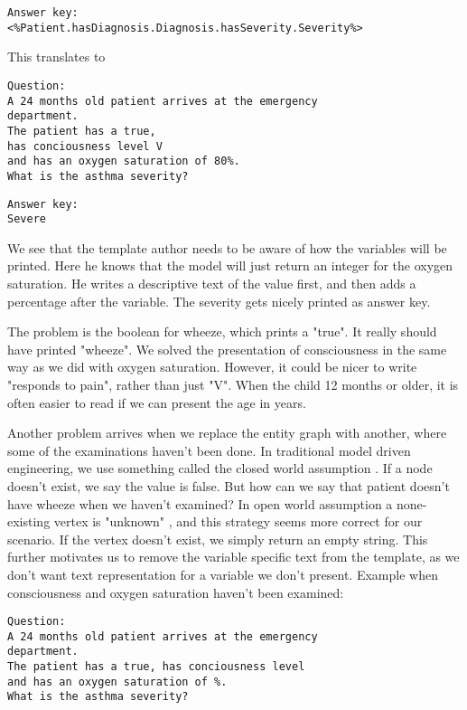  \begin{lstlisting}[caption={Answer key template}, frame=single, captionpos=b] 
Answer key:
<%Patient.hasDiagnosis.Diagnosis.hasSeverity.Severity%>
\end{lstlisting}

This translates to 
\begin{lstlisting}[caption={Question instantiation}, frame=single, captionpos=b] 
Question:
A 24 months old patient arrives at the emergency 
department. 
The patient has a true,
has conciousness level V 
and has an oxygen saturation of 80%. 
What is the asthma severity? 
\end{lstlisting}

 \begin{lstlisting}[caption={Answer key template}, frame=single, captionpos=b] 
Answer key:
Severe
\end{lstlisting}

We see that the template author needs to be aware of how the variables will be printed. Here he knows that the model will just return an integer for the oxygen saturation. He writes a descriptive text of the value first, and then adds a percentage after the variable. The severity gets nicely printed as answer key.

The problem is the boolean for wheeze, which prints a "true". It really should have printed "wheeze". We solved the presentation of consciousness in the same way as we did with oxygen saturation. However, it could be nicer to write "responds to pain", rather than just "V". When the child 12 months or older, it is often easier to read if we can present the age in years.

Another problem arrives when we replace the entity graph with another, where some of the examinations haven't been done. In traditional model driven engineering, we use something called the closed world assumption \parencite{Sadowska2019}. If a node doesn't exist, we say the value is false. But how can we say that patient doesn't have wheeze when we haven't examined? In open world assumption a none-existing vertex is "unknown" \parencite{Patel-Schneider2006} \parencite{Bergman2018}, and this strategy seems more correct for our scenario. If the vertex doesn't exist, we simply return an empty string. This further motivates us to remove the variable specific text from the template, as we don't want text representation for a variable we don't present. Example when consciousness and oxygen saturation haven't been examined:

\begin{lstlisting}[caption={Question instantiation}, frame=single, captionpos=b] 
Question:
A 24 months old patient arrives at the emergency 
department. 
The patient has a true, has conciousness level 
and has an oxygen saturation of %. 
What is the asthma severity? 
\end{lstlisting}

